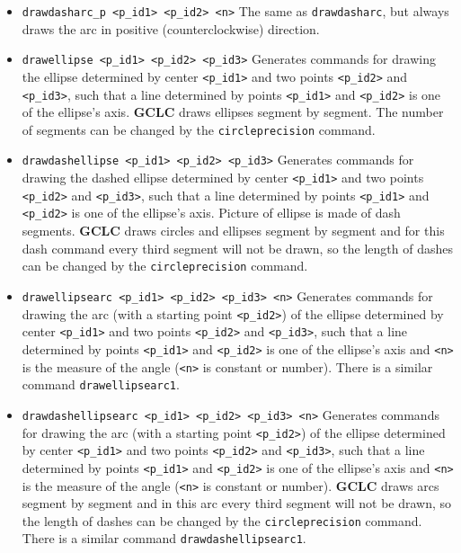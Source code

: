 \documentclass[a4paper]{book}
\newcommand{\gclc}{{\bfseries GCLC}\xspace}
\begin{document}
\begin{itemize}
\item \verb|drawdasharc_p <p_id1> <p_id2> <n>|
        The same as \verb|drawdasharc|, but always draws the arc in positive
        (counterclockwise) direction.


\item \verb|drawellipse <p_id1> <p_id2> <p_id3>|
        Generates commands for drawing the ellipse determined
        by center \verb|<p_id1>| and two points \verb|<p_id2>|
        and \verb|<p_id3>|, such that a line determined by points
        \verb|<p_id1>| and \verb|<p_id2>| is one of the ellipse's axis.
        \gclc draws ellipses segment by segment. The number of segments
        can be changed by the \verb|circleprecision| command.

\item \verb|drawdashellipse <p_id1> <p_id2> <p_id3>|
        Generates commands for drawing the dashed ellipse determined
        by center \verb|<p_id1>| and two points \verb|<p_id2>|
        and \verb|<p_id3>|, such that a line determined by points
        \verb|<p_id1>| and \verb|<p_id2>| is one of the ellipse's axis.
        Picture of ellipse is made of dash segments. \gclc draws
        circles and ellipses segment by segment and for this dash command
        every third segment will not be drawn, so the length of
        dashes can be changed by the \verb|circleprecision| command.

\item \verb|drawellipsearc <p_id1> <p_id2> <p_id3> <n>|
        Generates com\-mands for drawing the arc (with a starting
        point \verb|<p_id2>|) of the ellipse
        determined by center \verb|<p_id1>| and two points
        \verb|<p_id2>| and \verb|<p_id3>|, such that a line
        determined by points \verb|<p_id1>| and \verb|<p_id2>|
        is one of the ellipse's axis and \verb|<n>| is the measure of
        the angle (\verb|<n>| is constant or {\sc number}).
        There is a similar command \verb|drawellipsearc1|.

\item \verb|drawdashellipsearc <p_id1> <p_id2> <p_id3> <n>|
        Generates com\-mands for drawing the arc (with a starting
        point \verb|<p_id2>|) of the ellipse
        determined by center \verb|<p_id1>| and two points
        \verb|<p_id2>| and \verb|<p_id3>|, such that a line
        determined by points \verb|<p_id1>| and \verb|<p_id2>|
        is one of the ellipse's axis and \verb|<n>| is the measure of
        the angle (\verb|<n>| is constant or {\sc number}).
        \gclc draws arcs segment by segment and in this arc every 
        third segment will not be drawn, so the length of dashes 
        can be changed by the \verb|circleprecision| command.
        There is a similar command \verb|drawdashellipsearc1|.


\end{itemize}
\end{document}
